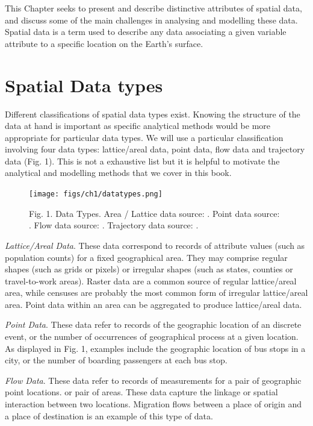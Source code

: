 \documentclass[
]{book}
\begin{document}
This Chapter seeks to present and describe distinctive attributes of spatial data, and discuss some of the main challenges in analysing and modelling these data. Spatial data is a term used to describe any data associating a given variable attribute to a specific location on the Earth's surface.

\hypertarget{spatial-data-types}{%
\section{Spatial Data types}\label{spatial-data-types}}

Different classifications of spatial data types exist. Knowing the structure of the data at hand is important as specific analytical methods would be more appropriate for particular data types. We will use a particular classification involving four data types: lattice/areal data, point data, flow data and trajectory data (Fig. 1). This is not a exhaustive list but it is helpful to motivate the analytical and modelling methods that we cover in this book.

\begin{figure}
\centering
\texttt{[image: figs/ch1/datatypes.png]}
\caption{Fig. 1. Data Types. Area / Lattice data source: \citet{onnerfors2019eurostat}. Point data source: \citet{tao2018travel}. Flow data source: \citet{rowe2020mapping}. Trajectory data source: \citet{kwan2004geovisualization}.}
\end{figure}

\emph{Lattice/Areal Data}. These data correspond to records of attribute values (such as population counts) for a fixed geographical area. They may comprise regular shapes (such as grids or pixels) or irregular shapes (such as states, counties or travel-to-work areas). Raster data are a common source of regular lattice/areal area, while censuses are probably the most common form of irregular lattice/areal area. Point data within an area can be aggregated to produce lattice/areal data.

\emph{Point Data}. These data refer to records of the geographic location of an discrete event, or the number of occurrences of geographical process at a given location. As displayed in Fig. 1, examples include the geographic location of bus stops in a city, or the number of boarding passengers at each bus stop.

\emph{Flow Data}. These data refer to records of measurements for a pair of geographic point locations. or pair of areas. These data capture the linkage or spatial interaction between two locations. Migration flows between a place of origin and a place of destination is an example of this type of data.
\end{document}
